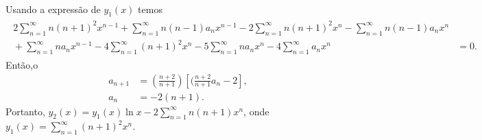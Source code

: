 \documentclass[a4paper,12pt, leqno, answers]{exam}
\begin{document}
\begin{questions}
\begin{solution}
\begin{align*}
\begin{split}
            \end{split}
        \end{align*}
        Usando a express\~{a}o de $y_1(x)$ temos 
        \begin{align*}
            \begin{split}
                2 \sum_{n = 1}^\infty n (n + 1)^2 x^{n - 1} + \sum_{n = 1}^\infty n (n - 1) a_n x^{n - 1} - 2 \sum_{n = 1}^\infty n (n + 1)^2 x^n - \sum_{n = 1}^\infty n (n - 1) a_n x^n & \\
                {}+ \sum_{n = 1}^\infty n a_n x^{n - 1} - 4 \sum_{n = 1}^\infty (n + 1)^2 x^n - 5 \sum_{n = 1}^\infty n a_n x^n - 4 \sum_{n = 1}^\infty a_n x^n &= 0.
            \end{split}
        \end{align*}
        Ent\~{a}o,o\begin{align*}
            a_{n + 1} &= \left( \frac{n + 2}{n + 1} \right) \left[ (\frac{n + 2}{n + 1} a_n - 2 \right], \\
            a_n &= -2 (n + 1).
        \end{align*}
        Portanto, $y_2(x) = y_1(x) \ln x - 2 \sum_{n = 1}^\infty n (n + 1) x^n$, onde $y_1(x) = \sum_{n = 1}^\infty (n + 1)^2 x^n$.
    \end{solution}
\end{questions}
\end{document}
